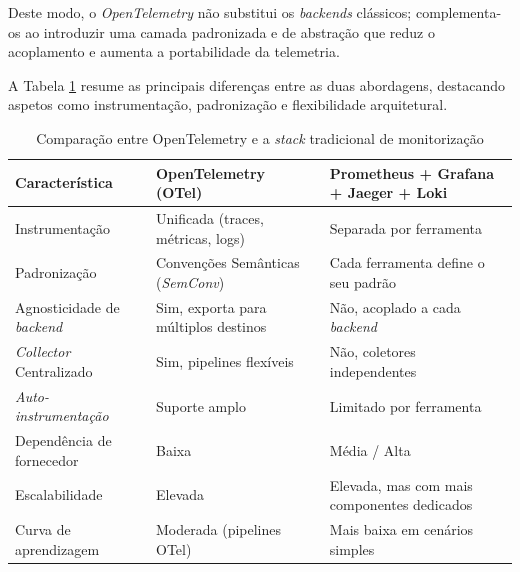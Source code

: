Deste modo, o \textit{OpenTelemetry} não substitui os \textit{backends} clássicos; complementa-os ao introduzir uma camada padronizada e de abstração que reduz o acoplamento e aumenta a portabilidade da telemetria.

A Tabela \ref{tab:otel_vs_tradicional} resume as principais diferenças entre as duas abordagens, destacando aspetos como instrumentação, padronização e flexibilidade arquitetural.

\begin{table}[h!]
\centering
\caption{Comparação entre OpenTelemetry e a \textit{stack} tradicional de monitorização}
\label{tab:otel_vs_tradicional}
\begin{tabular}{|p{4cm}|p{5cm}|p{5cm}|}
\hline
\textbf{Característica} & \textbf{OpenTelemetry (OTel)} & \textbf{Prometheus + Grafana + Jaeger + Loki} \\ \hline

Instrumentação & Unificada (traces, métricas, logs) & Separada por ferramenta \\ \hline
Padronização & Convenções Semânticas (\textit{SemConv}) & Cada ferramenta define o seu padrão \\ \hline
Agnosticidade de \textit{backend} & Sim, exporta para múltiplos destinos & Não, acoplado a cada \textit{backend} \\ \hline
\textit{Collector} Centralizado & Sim, pipelines flexíveis & Não, coletores independentes \\ \hline
\textit{Auto-instrumentação} & Suporte amplo & Limitado por ferramenta \\ \hline
Dependência de fornecedor & Baixa & Média / Alta \\ \hline
Escalabilidade & Elevada & Elevada, mas com mais componentes dedicados \\ \hline
Curva de aprendizagem & Moderada (pipelines OTel) & Mais baixa em cenários simples \\ \hline

\end{tabular}
\end{table}




